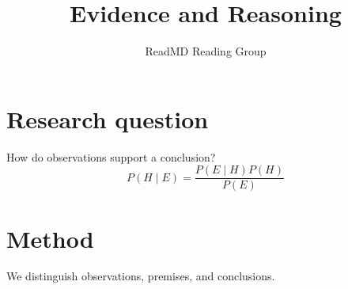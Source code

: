 \documentclass{article}
\title{Evidence and Reasoning}
\author{ReadMD Reading Group}
\begin{document}
\maketitle
\section{Research question}
How do observations support a conclusion?
\begin{equation}P(H\mid E)=\frac{P(E\mid H)P(H)}{P(E)}\end{equation}
\section{Method}
We distinguish observations, premises, and conclusions.
\end{document}
